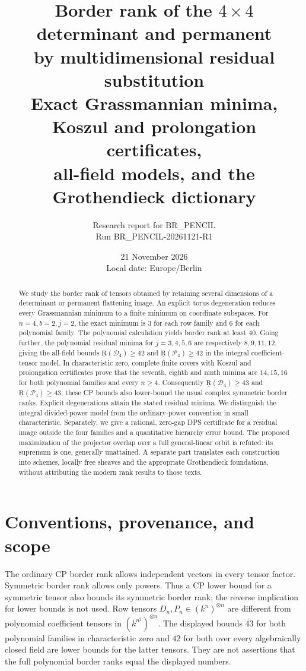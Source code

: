 \documentclass[11pt]{article}
\title{\textbf{Border rank of the $4\times4$ determinant and permanent\\by multidimensional residual substitution}\\[5pt]
\large Exact Grassmannian minima, Koszul and prolongation certificates,\\
all-field models, and the Grothendieck dictionary}
\author{Research report for BR\_PENCIL\\\small Run BR\_PENCIL-20261121-R1}
\date{21 November 2026\\\small Local date: Europe/Berlin}
\newcommand{\BR}{\underline{\mathrm R}}\newcommand{\TR}{\mathrm R}
\begin{document}
\maketitle
\begin{abstract}
We study the border rank of tensors obtained by retaining several
 dimensions of a determinant or permanent flattening image. An explicit
 torus degeneration reduces every Grassmannian minimum to a finite
 minimum on coordinate subspaces. For $n=4,b=2,j=2$, the exact minimum
 is $3$ for each row family and $6$ for each polynomial family. The
 polynomial calculation yields border rank at least $40$. Going further,
 the polynomial residual minima for $j=3,4,5,6$ are respectively $8,9,11,12$,
 giving the all-field bounds $\BR(\mathcal D_4)\geq42$ and
 $\BR(\mathcal P_4)\geq42$ in the integral coefficient-tensor model.
 In characteristic zero, complete finite covers with Koszul and
 prolongation certificates prove that the seventh, eighth and ninth
 minima are $14,15,16$ for both polynomial families and every $n\geq4$. Consequently
 $\BR(\mathcal D_4)\geq43$ and $\BR(\mathcal P_4)\geq43$;
 these CP bounds also lower-bound the usual complex symmetric
 border ranks. Explicit degenerations attain the stated residual
 minima. We distinguish the integral divided-power model from the
 ordinary-power convention in small characteristic. Separately,
 we give a rational, zero-gap DPS certificate for a residual image
 outside the four families and a quantitative hierarchy error bound.
 The proposed maximization of the projector overlap over a full
 general-linear orbit is refuted: its supremum is one, generally
 unattained. A separate part translates each construction into schemes,
 locally free sheaves and the appropriate Grothendieck foundations,
 without attributing the modern rank results to those texts.
\end{abstract}
\clearpage
{\small\tableofcontents}
\newpage

\section*{Conventions, provenance, and scope}
The ordinary CP border rank allows independent vectors in every
tensor factor. Symmetric border rank allows only powers. Thus a
CP lower bound for a symmetric tensor also bounds its symmetric
border rank; the reverse implication for lower bounds is not used.
Row tensors $D_n,P_n\in(k^n)^{\otimes n}$ are different from
polynomial coefficient tensors in $(k^{n^2})^{\otimes n}$.
The displayed bounds $43$ for both polynomial families in characteristic zero
and $42$ for both over every algebraically closed field
are lower bounds for the latter tensors. They are not assertions
that the full polynomial border ranks equal the displayed numbers.
\end{document}
